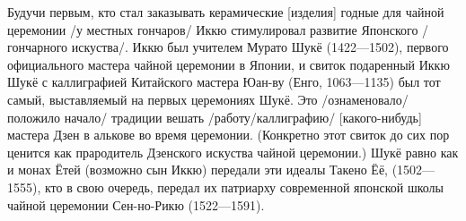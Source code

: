 \begin{ver}
  Будучи первым, кто стал заказывать керамические [изделия] годные для
  чайной церемонии /у местных гончаров/ Иккю
  стимулировал развитие Японского /гончарного
  искуства/. Иккю был учителем Мурато Шукё
  (1422---1502), первого официального мастера чайной церемонии в
  Японии, и свиток подаренный Иккю Шукё с каллиграфией Китайского
  мастера Юан-ву (Енго, 1063---1135) был тот самый, выставляемый на
  первых церемониях Шукё. Это /ознаменовало/положило начало/ традиции
  вешать /работу/каллиграфию/ [какого-нибудь] мастера Дзен в алькове
  во время церемонии. (Конкретно этот свиток до сих пор ценится как
  прародитель Дзенского искуства чайной церемонии.) Шукё равно как и
  монах Ётей (возможно сын Иккю) передали
  эти идеалы Такено Ёё, (1502---1555), кто в свою очередь, передал их
  патриарху современной японской школы чайной церемонии Сен-но-Рикю
  (1522---1591). 
\end{ver}

